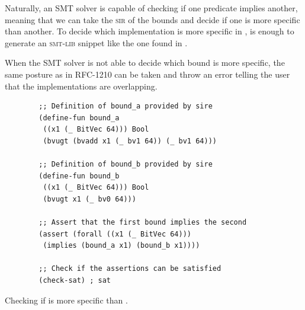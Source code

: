 Naturally, an SMT solver is capable of checking if one predicate implies
another, meaning that we can take the \textsc{sir} of the bounds and decide if
one is more specific than another. To decide which implementation is more
specific in , is enough to generate an
\textsc{smt-lib} snippet like the one found in .

When the SMT solver is not able to decide which bound is more specific, the
same posture as in RFC-1210 can be taken and throw an error telling the user
that the implementations are overlapping.

\begin{listing}[h]
	\begin{verbatim}
        ;; Definition of bound_a provided by sire
        (define-fun bound_a
         ((x1 (_ BitVec 64))) Bool 
         (bvugt (bvadd x1 (_ bv1 64)) (_ bv1 64)))

        ;; Definition of bound_b provided by sire
        (define-fun bound_b 
         ((x1 (_ BitVec 64))) Bool 
         (bvugt x1 (_ bv0 64)))

        ;; Assert that the first bound implies the second
        (assert (forall ((x1 (_ BitVec 64))) 
         (implies (bound_a x1) (bound_b x1))))

        ;; Check if the assertions can be satisfied
        (check-sat) ; sat
	\end{verbatim}
    \caption{Checking if  is more specific than .}
  \label{lst:trait_spec_smt}
\end{listing}
